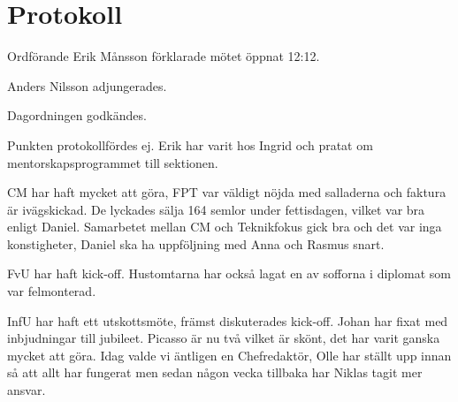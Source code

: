 \documentclass[10pt]{article}
\def\mo{Erik Månsson}
\begin{document}
\section*{Protokoll}
\begin{paragrafer}
Ordförande {\mo} förklarade mötet öppnat 12:12.

{\valavmo}

{\valavms}

{\valavj}

{\tosg}

Anders Nilsson adjungerades.

Dagordningen godkändes.


\begin{fyllnadsval} %
\end{fyllnadsval}

\begin{paragrafer}
Punkten protokollfördes ej.
Erik har varit hos Ingrid och pratat om mentorskapsprogrammet till sektionen.

CM har haft mycket att göra, FPT var väldigt nöjda med salladerna och faktura är ivägskickad. De lyckades sälja 164 semlor under fettisdagen, vilket var bra enligt Daniel. Samarbetet mellan CM och Teknikfokus gick bra och det var inga konstigheter, Daniel ska ha uppföljning med Anna och Rasmus snart.

FvU har haft kick-off. Hustomtarna har också lagat en av sofforna i diplomat som var felmonterad.

InfU har haft ett utskottsmöte, främst diskuterades kick-off. Johan har fixat med inbjudningar till jubileet. Picasso är nu två vilket är skönt, det har varit ganska mycket att göra. Idag valde vi äntligen en Chefredaktör, Olle har ställt upp innan så att allt har fungerat men sedan någon vecka tillbaka har Niklas tagit mer ansvar.


\end{paragrafer}
\end{paragrafer}
\end{document}
